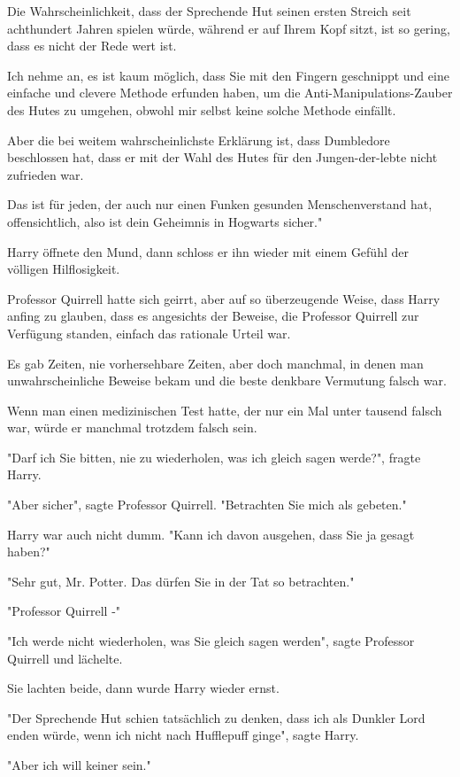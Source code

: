 {Die Wahrscheinlichkeit, dass der Sprechende Hut seinen ersten Streich seit achthundert Jahren spielen würde, während er auf Ihrem Kopf sitzt, ist so gering, dass es nicht der Rede wert ist.

Ich nehme an, es ist kaum möglich, dass Sie mit den Fingern geschnippt und eine einfache und clevere Methode erfunden haben, um die Anti-Manipulations-Zauber des Hutes zu umgehen, obwohl mir selbst keine solche Methode einfällt.

Aber die bei weitem wahrscheinlichste Erklärung ist, dass Dumbledore beschlossen hat, dass er mit der Wahl des Hutes für den Jungen-der-lebte nicht zufrieden war.

Das ist für jeden, der auch nur einen Funken gesunden Menschenverstand hat, offensichtlich, also ist dein Geheimnis in Hogwarts sicher."

Harry öffnete den Mund, dann schloss er ihn wieder mit einem Gefühl der völligen Hilflosigkeit.

Professor Quirrell hatte sich geirrt, aber auf so überzeugende Weise, dass Harry anfing zu glauben, dass es angesichts der Beweise, die Professor Quirrell zur Verfügung standen, einfach das rationale Urteil war.

Es gab Zeiten, nie vorhersehbare Zeiten, aber doch manchmal, in denen man unwahrscheinliche Beweise bekam und die beste denkbare Vermutung falsch war.

Wenn man einen medizinischen Test hatte, der nur ein Mal unter tausend falsch war, würde er manchmal trotzdem falsch sein.

"Darf ich Sie bitten, nie zu wiederholen, was ich gleich sagen werde?", fragte Harry.

"Aber sicher", sagte Professor Quirrell. "Betrachten Sie mich als gebeten."

Harry war auch nicht dumm. "Kann ich davon ausgehen, dass Sie ja gesagt haben?"

"Sehr gut, Mr. Potter. Das dürfen Sie in der Tat so betrachten."

"Professor Quirrell -"

"Ich werde nicht wiederholen, was Sie gleich sagen werden", sagte Professor Quirrell und lächelte.

Sie lachten beide, dann wurde Harry wieder ernst.

"Der Sprechende Hut schien tatsächlich zu denken, dass ich als Dunkler Lord enden würde, wenn ich nicht nach Hufflepuff ginge", sagte Harry.

"Aber ich will keiner sein."

}
